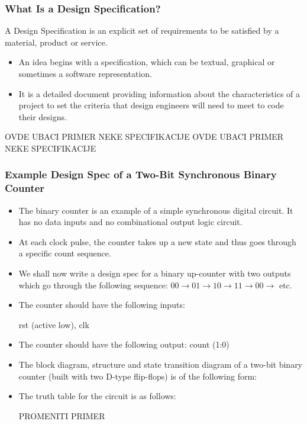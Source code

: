 \documentclass{beamer}
\begin{document}
\begin{frame}
\frametitle{What Is a Design Specification?}
A Design Specification is an explicit
set of requirements to be satisfied by
a material, product or service.

\begin{itemize}
\item An idea begins with a specification, which can be textual, graphical or sometimes a software representation.

\item It is a detailed document providing information about the characteristics of a project to set the criteria that design
engineers will need to meet to code their designs.
\end{itemize}

OVDE UBACI PRIMER NEKE SPECIFIKACIJE
OVDE UBACI PRIMER NEKE SPECIFIKACIJE

\end{frame}



\begin{frame}
\frametitle{Example Design Spec of a Two-Bit Synchronous Binary Counter}

\begin{itemize}
\item The binary counter is an example of a simple
synchronous digital circuit. It has no data
inputs and no combinational output logic
circuit.
\item At each clock pulse, the counter takes up a
new state and thus goes through a specific
count sequence.

\item We shall now write a design spec for a binary
up-counter with two outputs which go through
the following sequence: $00 \rightarrow 01 \rightarrow 10 \rightarrow 11 \rightarrow 00 \rightarrow $ etc.

\item The counter should have the following inputs:

rst (active low),
clk

\item The counter should have the following output: count (1:0)

\item The block diagram, structure and state transition
diagram of a two-bit binary counter (built with two
D-type flip-flops) is of the following form:

\item The truth table for the circuit is as follows:

PROMENITI PRIMER
\end{itemize}


\end{frame}
\end{document}
